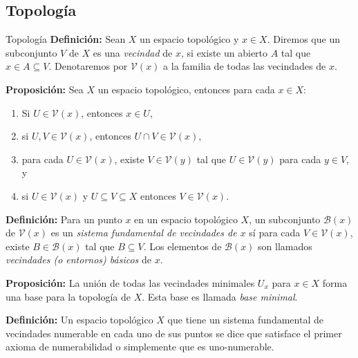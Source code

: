 \documentclass[9pt]{beamer}
\begin{document}
\subsection{Topología}
\begin{frame}{Topología}
\textbf{Definición:} Sean $X$ un espacio topológico y $x\in X$. Diremos que un subconjunto $V$ de $X$ es una \textit{vecindad} de $x$, si existe un abierto $A$ tal que $x\in A\subseteq V$. Denotaremos por $\mathcal{V}(x)$ a la familia de todas las vecindades de $x$.

\textbf{Proposición:} Sea $X$ un espacio topológico, entonces para cada $x\in X$:
\begin{enumerate}
    \item Si $U\in\mathcal{V}(x)$, entonces $x\in U$,
    \item si $U,V\in\mathcal{V}(x)$, entonces $U\cap V\in\mathcal{V}(x)$,
    \item para cada $U\in\mathcal{V}(x)$, existe $V\in\mathcal{V}(y)$ tal que $U\in\mathcal{V}(y)$ para cada $y\in V$, y 
    \item si $U\in\mathcal{V}(x)$ y $U\subseteq V\subseteq X$ entonces $V\in\mathcal{V}(x)$.
\end{enumerate}

\textbf{Definición:} Para un punto $x$ en un espacio topológico $X$, un subconjunto $\mathcal{B}(x)$ de $\mathcal{V}(x)$ es un \textit{sistema fundamental de vecindades de $x$} sí para cada $V\in\mathcal{V}(x)$, existe $B\in\mathcal{B}(x)$ tal que $B\subseteq V$. Los elementos de $\mathcal{B}(x)$ son llamados \textit{vecindades (o entornos) básicos} de $x$.

\textbf{Proposición:} La unión de todas las vecindades minimales $U_x$ para $x\in X$ forma una base para la topología de $X$. Esta base es llamada \textit{base minimal}.

\textbf{Definición:} Un espacio topológico $X$ que tiene un sistema fundamental de vecindades numerable en cada uno de sus puntos se dice que satisface el primer axioma de numerabilidad o simplemente que es uno-numerable.
\end{frame}
\end{document}
